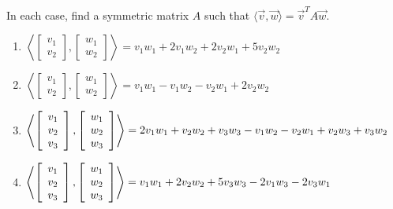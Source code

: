 \documentclass{ximera}
\begin{document}
\begin{problem}\label{prob:inner_prod_13}
In each case, find a symmetric matrix $A$ such that $\langle\vec{v}, \vec{w}\rangle = \vec{v}^{T}A\vec{w}$.


\begin{enumerate} 
\item
$  \left\langle
\left[ \begin{array}{r}
v_1 \\
v_2
\end{array} \right], \left[ \begin{array}{r}
w_1 \\
w_2
\end{array} \right]
\right\rangle
= v_1w_1 + 2v_1w_2 + 2v_2w_1 + 5v_2w_2$

\item
$\left\langle
\left[ \begin{array}{r}
v_1 \\
v_2
\end{array} \right], \left[ \begin{array}{r}
w_1 \\
w_2
\end{array} \right]
\right\rangle
= v_1w_1 - v_1w_2 - v_2w_1 + 2v_2w_2$

\item
$\left\langle
\left[ \begin{array}{r}
v_1 \\
v_2 \\
v_3
\end{array} \right], \left[ \begin{array}{r}
w_1 \\
w_2 \\
w_3
\end{array} \right]
\right\rangle
= 2v_1w_1 + v_2w_2 + v_3w_3 - v_1w_2 \\ -v_2w_1 + v_2w_3 + v_3w_2$

\item
$\left\langle
\left[ \begin{array}{r}
v_1 \\
v_2 \\
v_3
\end{array} \right], \left[ \begin{array}{r}
w_1 \\
w_2 \\
w_3
\end{array} \right]
\right\rangle
= v_1w_1 + 2v_2w_2 + 5v_3w_3 \\ - 2v_1w_3 - 2v_3w_1$


\end{enumerate}
\end{problem}
\end{document}
